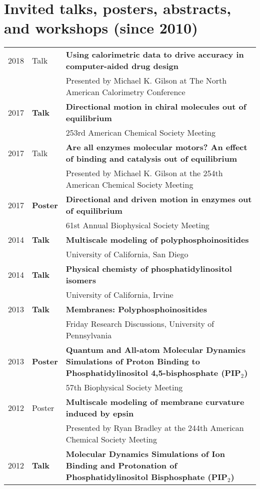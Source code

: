 \documentclass[letterpaper,11pt]{article}
\begin{document}
\section{Invited talks, posters, abstracts, and workshops (since 2010)}
\begin{tabular}{ll p{14 cm}}
2018 & Talk & \bf{Using calorimetric data to drive accuracy in computer-aided drug design} \\
&& Presented by Michael K. Gilson at The North American Calorimetry Conference \\
2017 & \bf{Talk} & \textbf{Directional motion in chiral molecules out of equilibrium} \\
     && 253rd American Chemical Society Meeting \\
2017 & Talk & \textbf{Are all enzymes molecular motors? An effect of binding and catalysis out of equilibrium} \\
     && Presented by Michael K. Gilson at the 254th American Chemical Society Meeting \\
2017 & \bf{Poster} & \textbf{Directional and driven motion in enzymes out of equilibrium} \\
     && 61st Annual Biophysical Society Meeting \\     
2014 & \bf{Talk} & \textbf{Multiscale modeling of polyphosphoinositides}\\
     && University of California, San Diego\\
2014 & \bf{Talk} & \textbf{Physical chemisty of phosphatidylinositol isomers}\\
     && University of California, Irvine\\
2013 & \bf{Talk} & \textbf{Membranes: Polyphosphoinositides}\\
     && Friday Research Discussions, University of Pennsylvania\\
2013 & \bf{Poster} & \textbf{Quantum and All-atom Molecular Dynamics Simulations of Proton   Binding to Phosphatidylinositol 4,5-bisphosphate (PIP$_2$)}\\
     && 57th Biophysical Society Meeting\\
2012 & Poster & \textbf{Multiscale modeling of membrane curvature induced by epsin} \\
     && Presented by Ryan Bradley at the 244th American Chemical Society Meeting \\
2012 & \bf{Talk} & \textbf{Molecular Dynamics Simulations of Ion Binding and Protonation of 
Phosphatidylinositol Bisphosphate (PIP$_2$)} \\

\end{tabular}
\end{document}

